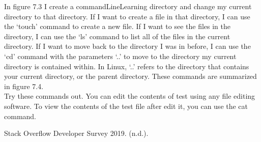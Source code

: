 In figure 7.3 I create a commandLineLearning directory and change my current directory to that directory. If I want to create a file in that directory, I can use the ‘touch’ command to create a new file. If I want to see the files in the directory, I can use the ‘ls’ command to list all of the files in the current directory. If I want to move back to the directory I was in before, I can use the ‘cd’ command with the parameters ‘..’ to move to the directory my current directory is contained within. In Linux, ‘..’ refers to the directory that contains your current directory, or the parent directory. These commands are summarized in figure 7.4. \\

Try these commands out. You can edit the contents of test using any file editing software. To view the contents of the test file after edit it, you can use the cat command. \\


Stack Overflow Developer Survey 2019. (n.d.).